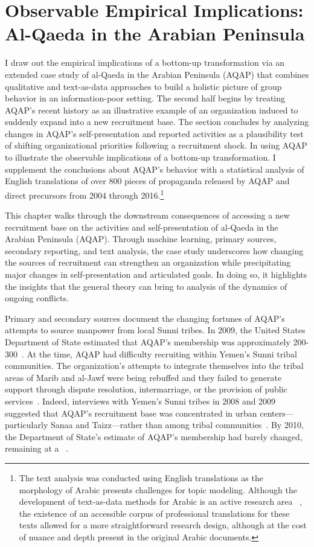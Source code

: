 \chapter{Observable Empirical Implications: Al-Qaeda in the Arabian Peninsula}
\label{chapter:aqap}

I draw out the empirical implications of a bottom-up transformation via an extended case study of al-Qaeda in the Arabian Peninsula (AQAP) that combines qualitative and text-as-data approaches to build a holistic picture of group behavior in an information-poor setting.  The second half begins by treating AQAP's recent history as an illustrative example of an organization induced to suddenly expand into a new recruitment base. The section concludes by analyzing changes in AQAP's self-presentation and reported activities as a plausibility test of shifting organizational priorities following a recruitment shock. In using AQAP to illustrate the observable implications of a bottom-up transformation. I supplement the conclusions about AQAP's behavior with a statistical analysis of English translations of over 800 pieces of propaganda released by AQAP and direct precursors from 2004 through 2016.\footnote{The text analysis was conducted using English translations as the morphology of Arabic presents challenges for topic modeling. Although the development of text-as-data methods for Arabic is an active research area ~\autocite{brahmi2012arabic, abbas2011evaluation,salloum2018survey}, the existence of an accessible corpus of professional translations for these texts allowed for a more  straightforward research design, although at the cost of nuance and depth present in the original Arabic documents.}

This chapter walks through the downstream consequences of accessing a new recruitment base on the activities and self-presentation of al-Qaeda in the Arabian Peninsula (AQAP). Through  machine learning, primary sources, secondary reporting, and text analysis, the case study underscores how changing the sources of recruitment can strengthen an organization while precipitating major changes in self-presentation and articulated goals. In doing so, it highlights the insights that the general theory can bring to analysis of the dynamics of ongoing conflicts. 

Primary and secondary sources document the changing fortunes of AQAP's attempts to source manpower from local Sunni tribes. In 2009, the United States Department of State estimated that AQAP's membership was approximately 200-300~\autocite{johnsen2012upper}.  At the time, AQAP had difficulty recruiting within Yemen's Sunni tribal communities. The organization's attempts to integrate themselves into the tribal areas of Marib and al-Jawf were being rebuffed and they failed to generate support through dispute resolution, intermarriage, or the provision of public services~\autocite{koehler2011false}. Indeed, interviews with Yemen's Sunni tribes in 2008 and 2009 suggested that AQAP's recruitment base was concentrated in urban centers--- particularly Sanaa and Taizz---rather than among tribal communities~\autocite[138]{koehler2011false}. By 2010, the Department of State's estimate of AQAP's membership had barely changed, remaining at a ~\autocite{ctr2010terrorism}. 

